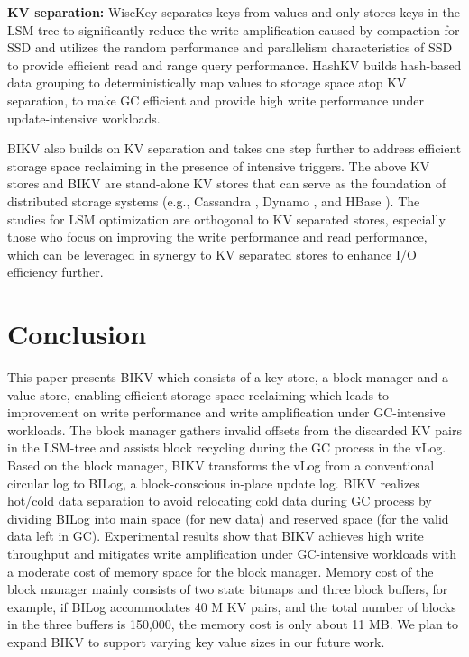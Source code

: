 \documentclass[sigconf]{acmart}
\begin{document}
\textbf{KV separation:} WiscKey \cite{Wisckey} separates keys from values and only stores keys in the LSM-tree to significantly reduce the write amplification caused by compaction for SSD and utilizes the random performance and parallelism characteristics of SSD to provide efficient read and range query performance. HashKV \cite{HashKV} builds hash-based data grouping to deterministically map values to storage space atop KV separation, to make GC efficient and provide high write performance under update-intensive workloads.

BIKV also builds on KV separation and takes one step further to address efficient storage space reclaiming in the presence of intensive triggers. The above KV stores and BIKV are stand-alone KV stores that can serve as the foundation of distributed storage systems (e.g., Cassandra \cite{ Cassandra}, Dynamo \cite{ Dynamo}, and HBase \cite{HBase}). The studies for LSM optimization are orthogonal to KV separated stores, especially those who focus on improving the write performance and read performance, which can be leveraged in synergy to KV separated stores to enhance I/O efficiency further.

\section{Conclusion} \label{conclusion}

This paper presents BIKV which consists of a key store, a block manager and a value store, enabling efficient storage space reclaiming which leads to improvement on write performance and write amplification under GC-intensive workloads. The block manager gathers invalid offsets from the discarded KV pairs in the LSM-tree and assists block recycling during the GC process in the vLog. Based on the block manager, BIKV transforms the vLog from a conventional circular log to BILog, a block-conscious in-place update log. BIKV realizes hot/cold data separation to avoid relocating cold data during GC process by dividing BILog into main space (for new data) and reserved space (for the valid data left in GC). Experimental results show that BIKV achieves high write throughput and mitigates write amplification under GC-intensive workloads with a moderate cost of memory space for the block manager. Memory cost of the block manager mainly consists of two state bitmaps and three block buffers, for example, if BILog accommodates 40 M KV pairs, and the total number of blocks in the three buffers is 150,000, the memory cost is only about 11 MB. We plan to expand BIKV to support varying key value sizes in our future work. 

\iffalse
\begin{acks}
	...
\end{acks}
\fi




\end{document}
